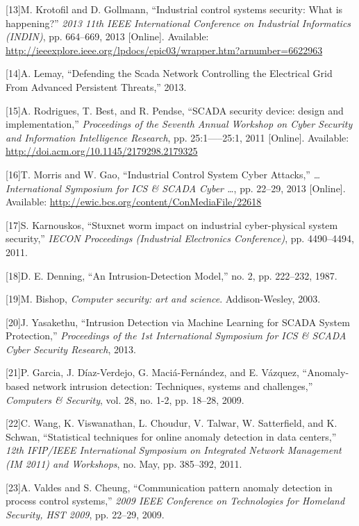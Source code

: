 \documentclass[11pt,a4paper]{article}
\begin{document}
{[}13{]}M. Krotofil and D. Gollmann, ``Industrial control systems
security: What is happening?'' \emph{2013 11th IEEE International
Conference on Industrial Informatics (INDIN)}, pp. 664--669, 2013
{[}Online{]}. Available:
\url{http://ieeexplore.ieee.org/lpdocs/epic03/wrapper.htm?arnumber=6622963}

{[}14{]}A. Lemay, ``Defending the Scada Network Controlling the
Electrical Grid From Advanced Persistent Threats,'' 2013.

{[}15{]}A. Rodrigues, T. Best, and R. Pendse, ``SCADA security device:
design and implementation,'' \emph{Proceedings of the Seventh Annual
Workshop on Cyber Security and Information Intelligence Research}, pp.
25:1-----25:1, 2011 {[}Online{]}. Available:
\url{http://doi.acm.org/10.1145/2179298.2179325}

{[}16{]}T. Morris and W. Gao, ``Industrial Control System Cyber
Attacks,'' \emph{\ldots{}International Symposium for ICS \& SCADA Cyber
\ldots{}}, pp. 22--29, 2013 {[}Online{]}. Available:
\url{http://ewic.bcs.org/content/ConMediaFile/22618}

{[}17{]}S. Karnouskos, ``Stuxnet worm impact on industrial
cyber-physical system security,'' \emph{IECON Proceedings (Industrial
Electronics Conference)}, pp. 4490--4494, 2011.

{[}18{]}D. E. Denning, ``An Intrusion-Detection Model,'' no. 2, pp.
222--232, 1987.

{[}19{]}M. Bishop, \emph{Computer security: art and science}.
Addison-Wesley, 2003.

{[}20{]}J. Yasakethu, ``Intrusion Detection via Machine Learning for
SCADA System Protection,'' \emph{Proceedings of the 1st International
Symposium for ICS \& SCADA Cyber Security Research}, 2013.

{[}21{]}P. Garcia, J. Díaz-Verdejo, G. Maciá-Fernández, and E. Vázquez,
``Anomaly-based network intrusion detection: Techniques, systems and
challenges,'' \emph{Computers \& Security}, vol. 28, no. 1-2, pp.
18--28, 2009.

{[}22{]}C. Wang, K. Viswanathan, L. Choudur, V. Talwar, W. Satterfield,
and K. Schwan, ``Statistical techniques for online anomaly detection in
data centers,'' \emph{12th IFIP/IEEE International Symposium on
Integrated Network Management (IM 2011) and Workshops}, no. May, pp.
385--392, 2011.

{[}23{]}A. Valdes and S. Cheung, ``Communication pattern anomaly
detection in process control systems,'' \emph{2009 IEEE Conference on
Technologies for Homeland Security, HST 2009}, pp. 22--29, 2009.
\end{document}
